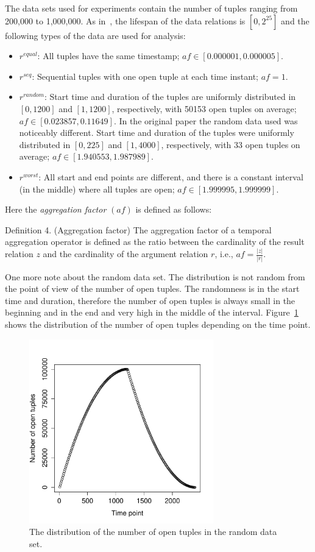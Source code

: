 \documentclass[a4paper,11pt]{article}
\begin{document}
The data sets used for experiments contain the number of tuples ranging from 200,000 to 1,000,000. As in~\cite{bohlen}, the lifespan of the data relations is $[0,2^{25}]$ and the following types of the data are used for analysis:
\begin{itemize}
\item
$r^{equal}$: All tuples have the same timestamp; $af \in [0.000001, 0.000005]$.
\item
$r^{seq}$: Sequential tuples with one open tuple at each time instant; $af=1$.
\item
$r^{random}$: Start time and duration of the tuples are uniformly distributed in $[0,1200]$ and $[1,1200]$, respectively, with 50153 open tuples on average; $af \in [0.023857, 0.11649]$. In the original paper the random data used was noticeably different. Start time and duration of the tuples were uniformly distributed in $[0,225]$ and $[1,4000]$, respectively, with 33 open tuples on average; $af \in [1.940553, 1.987989]$.
\item
$r^{worst}$: All start and end points are different, and there is a constant interval (in the
middle) where all tuples are open; $af \in [1.999995, 1.999999]$.
\end{itemize}

Here the \textit{aggregation factor} $(af)$ is defined as follows:

Definition 4. (Aggregation factor) The aggregation factor of a temporal aggregation operator is defined as the ratio between the cardinality of the result relation $z$ and the cardinality of the argument relation $r$, i.e., $af = \frac{|z|}{|r|}$.

One more note about the random data set. The distribution is not random from the point of view of the number of open tuples. The randomness is in the start time and duration, therefore the number of open tuples is always small in the beginning and in the end and very high in the middle of the interval. Figure~\ref{open_tuples} shows the distribution of the number of open tuples depending on the time point. 

\begin{figure}[ht!]
\centering 
\includegraphics[width=80mm]{../graphs/random_open_tuples.pdf}
\caption{The distribution of the number of open tuples in the random data set.}
\label{open_tuples} 
\end{figure}
\end{document}

